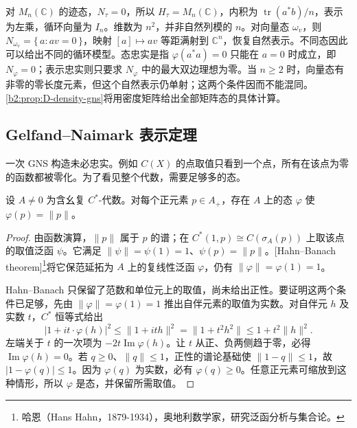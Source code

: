 \ProseParagraphBreak
对 \(M_n(\mathbb C)\) 的迹态，\(N_\tau=0\)，所以 \(H_\tau=M_n(\mathbb C)\)，内积为 \(\operatorname{tr}(a^*b)/n\)，表示为左乘，循环向量为 \(I_n\)。维数为 \(n^2\)，并非自然列模的 \(n\)。对向量态 \(\omega_v\)，则 \(N_{\omega_v}=\{\,a:av=0\,\}\)，映射 \([a]\mapsto av\) 等距满射到 \(\mathbb C^n\)，恢复自然表示。不同态因此可以给出不同的循环模型。态忠实是指 \(\varphi(a^*a)=0\) 只能在 \(a=0\) 时成立，即 \(N_\varphi=0\)；表示忠实则只要求 \(N_\varphi\) 中的最大双边理想为零。当 \(n\ge2\) 时，向量态有非零的零长度元素，但这个自然表示仍单射；这两个条件因而不能混同。\cref{b2:prop:D-density-gns}将用密度矩阵给出全部矩阵态的具体计算。

\subsection{Gelfand--Naimark 表示定理}
\label{b2:subsec:D03:03}

一次 GNS 构造未必忠实。例如 \(C(X)\) 的点取值只看到一个点，所有在该点为零的函数都被零化。为了看见整个代数，需要足够多的态。

\begin{proposition}[达到范数的态]\label{b2:prop:norming-state-external}
	设 \(A\ne0\) 为含幺复 \(C^*\)-代数。对每个正元素 \(p\in A_+\)，存在 \(A\) 上的态 \(\varphi\) 使 \(\varphi(p)=\|p\|\)。
\end{proposition}

\begin{proof}
	由函数演算，\(\|p\|\) 属于 \(p\) 的谱；在 \(C^*(1,p)\cong C(\sigma_A(p))\) 上取该点的取值泛函 \(\psi\)。它满足 \(\|\psi\|=\psi(1)=1\)、\(\psi(p)=\|p\|\)。[Hahn--Banach theorem]\footnote{哈恩（Hans Hahn，1879-1934），奥地利数学家，研究泛函分析与集合论。}将它保范延拓为 \(A\) 上的复线性泛函 \(\varphi\)，仍有 \(\|\varphi\|=\varphi(1)=1\)。

	Hahn--Banach 只保留了范数和单位元上的取值，尚未给出正性。要证明这两个条件已足够，先由 \(\|\varphi\|=\varphi(1)=1\) 推出自伴元素的取值为实数。对自伴元 \(h\) 及实数 \(t\)，\(C^*\) 恒等式给出
	\[
		|1+it\cdot\varphi(h)|^2\le\|1+ith\|^2 =\|1+t^2h^2\|\le1+t^2\|h\|^2.
	\]
	左端关于 \(t\) 的一次项为 \(-2t\operatorname{Im}\varphi(h)\)。让 \(t\) 从正、负两侧趋于零，必得 \(\operatorname{Im}\varphi(h)=0\)。若 \(q\ge0\)、\(\|q\|\le1\)，正性的谱论基础使 \(\|1-q\|\le1\)，故 \(|1-\varphi(q)|\le1\)。因为 \(\varphi(q)\) 为实数，必有 \(\varphi(q)\ge0\)。任意正元素可缩放到这种情形，所以 \(\varphi\) 是态，并保留所需取值。
\end{proof}

